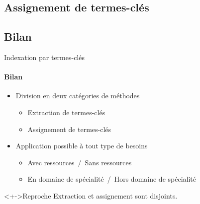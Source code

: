   \subsection{Assignement de termes-clés}
    

  \subsection{Bilan}
  \begin{frame}{Indexation par termes-clés}\framesubtitle{Bilan}
    \begin{itemize}
      \item<+->{Division en deux catégories de méthodes}
      \begin{itemize}
        \item{Extraction de termes-clés}
        \item{Assignement de termes-clés}
      \end{itemize}
      \item<+->{Application possible à tout type de besoins}
      \begin{itemize}
        \item{Avec ressources~/~Sans ressources}
        \item{En domaine de spécialité~/~Hors domaine de spécialité}
      \end{itemize}
    \end{itemize}

    \vspace{1em}

    \begin{alertblock}<+->{Reproche}
      Extraction et assignement sont disjoints.
    \end{alertblock}
  \end{frame}
